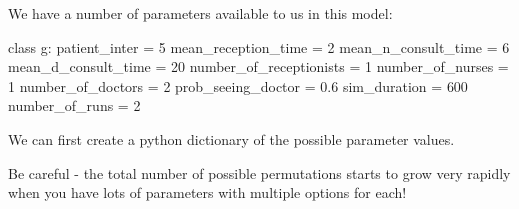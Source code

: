 \documentclass[
  letterpaper,
  DIV=11,
  numbers=noendperiod]{scrreprt}
\newenvironment{Shaded}{}{}
\newcommand{\DecValTok}[1]{\textcolor[rgb]{0.00,0.36,0.77}{#1}}
\newcommand{\FloatTok}[1]{\textcolor[rgb]{0.00,0.36,0.77}{#1}}
\newcommand{\KeywordTok}[1]{\textcolor[rgb]{0.84,0.23,0.29}{#1}}
\newcommand{\NormalTok}[1]{\textcolor[rgb]{0.14,0.16,0.18}{#1}}
\newcommand{\OperatorTok}[1]{\textcolor[rgb]{0.14,0.16,0.18}{#1}}
\begin{document}
We have a number of parameters available to us in this model:

\begin{Shaded}
\begin{Highlighting}[]
\KeywordTok{class}\NormalTok{ g:}
\NormalTok{    patient\_inter }\OperatorTok{=} \DecValTok{5}
\NormalTok{    mean\_reception\_time }\OperatorTok{=} \DecValTok{2}
\NormalTok{    mean\_n\_consult\_time }\OperatorTok{=} \DecValTok{6}
\NormalTok{    mean\_d\_consult\_time }\OperatorTok{=} \DecValTok{20}
\NormalTok{    number\_of\_receptionists }\OperatorTok{=} \DecValTok{1}
\NormalTok{    number\_of\_nurses }\OperatorTok{=} \DecValTok{1}
\NormalTok{    number\_of\_doctors }\OperatorTok{=} \DecValTok{2}
\NormalTok{    prob\_seeing\_doctor }\OperatorTok{=} \FloatTok{0.6}
\NormalTok{    sim\_duration }\OperatorTok{=} \DecValTok{600}
\NormalTok{    number\_of\_runs }\OperatorTok{=} \DecValTok{2}
\end{Highlighting}
\end{Shaded}

We can first create a python dictionary of the possible parameter
values.

\begin{tcolorbox}[enhanced jigsaw, colframe=quarto-callout-warning-color-frame, bottomtitle=1mm, breakable, rightrule=.15mm, coltitle=black, colbacktitle=quarto-callout-warning-color!10!white, opacityback=0, leftrule=.75mm, arc=.35mm, toptitle=1mm, title=\textcolor{quarto-callout-warning-color}{\faExclamationTriangle}\hspace{0.5em}{Warning}, titlerule=0mm, colback=white, toprule=.15mm, bottomrule=.15mm, left=2mm, opacitybacktitle=0.6]

Be careful - the total number of possible permutations starts to grow
very rapidly when you have lots of parameters with multiple options for
each!

\end{tcolorbox}
\end{document}
